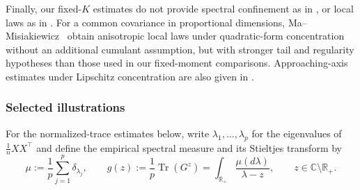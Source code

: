\documentclass[EJP, preprint, NODS, nobera, nofontexpansion]{ejpecp}
\DeclareMathOperator{\tr}{Tr}
\begin{document}
Finally, our fixed-$K$ estimates do not provide spectral confinement
as in \cite{BenaychGeorgesCouillet2016,ZhuangZhangXuSong2026}, or local
laws as in \cite{KnowlesYin2017,AltErdosKruger2017,FanMaPaquetteWang2026}.
For a common covariance in proportional dimensions,
Ma--Misiakiewicz~\cite{MaMisiakiewicz2026} obtain anisotropic local laws
under quadratic-form concentration without an additional cumulant
assumption, but with stronger tail and regularity hypotheses than
those used in our fixed-moment comparisons.
Approaching-axis estimates under Lipschitz concentration are also given
in \cite{Chouard2022}.







\subsubsection{Selected illustrations}
For the normalized-trace estimates below, write $\lambda_1,\ldots,\lambda_p$
for the eigenvalues of $\frac1n XX^\top$ and define the empirical spectral
measure and its Stieltjes transform by
\[
    \mu:=\frac1p\sum_{j=1}^p\delta_{\lambda_j},
    \qquad
    g(z):=\frac1p\tr(G^z)
         =\int_{\mathbb R_+}\frac{\mu(d\lambda)}{\lambda-z},
    \qquad z\in\mathbb C\setminus\mathbb R_+.
\]
\end{document}
